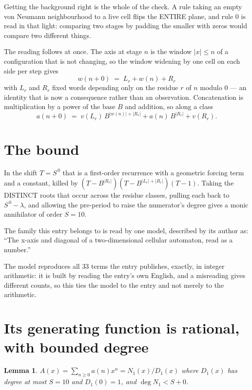 \documentclass[11pt,a4paper]{article}
\theoremstyle{plain}
\newtheorem{lemma}[theorem]{Lemma}
\theoremstyle{definition}
\begin{document}
Getting the background right is the whole of the check. A rule taking an empty von Neumann
neighbourhood to a live cell flips the ENTIRE plane, and rule 0 is read
in that light: comparing two stages by padding the smaller with zeros would compare two
different things.

The reading follows at once. The axis at stage $n$ is the window $|x|\le n$ of a configuration
that is not changing, so the window widening by one cell on each side per step gives
\[
w(n+0)\;=\;L_r + w(n) + R_r
\]
with $L_r$ and $R_r$ fixed words depending only on the residue $r$ of $n$ modulo $0$ --- an
identity that is now a consequence rather than an observation. Concatenation is multiplication
by a power of the base $B$ and addition, so along a class
\[
a(n+0)\;=\;v(L_r)\,B^{|w(n)|+|R_r|} + a(n)\,B^{|R_r|} + v(R_r).
\]

\section{The bound}

In the shift $T=S^{\,0}$ that is a first-order recurrence with a geometric forcing term and a
constant, killed by $(T-B^{|R_r|})(T-B^{|L_r|+|R_r|})(T-1)$. Taking the DISTINCT roots that
occur across the residue classes, pulling each back to $S^{\,0}-\lambda$, and allowing the
pre-period to raise the numerator's degree gives a monic annihilator of order $S=10$.

The family this entry belongs to is read by one model, described by its author as: ``The x-axis and diagonal of a two-dimensional cellular automaton, read as a number.''


The model reproduces all $33$ terms the entry publishes, exactly, in integer arithmetic:
it is built by reading the entry's own English, and a misreading gives different counts, so
this ties the model to the entry and not merely to the arithmetic.

\section{Its generating function is rational, with bounded degree}

\begin{lemma}\label{lem:rat}
$A(x)=\sum_{n\ge0}a(n)x^n=N_1(x)/D_1(x)$ where $D_1(x)$ has degree at most $S=10$ and
$D_1(0)=1$, and $\deg N_1<S+0$.
\end{lemma}
\end{document}
